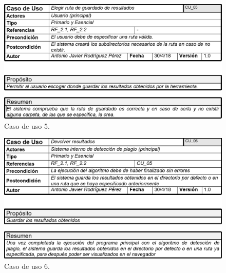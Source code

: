 \begin{figure}[H] %
\centering
\includegraphics[scale=0.5]{imagenes/CU_05.png}  %
\caption{Caso de uso 5.} \label{fig:CU5}
\end{figure}

\begin{figure}[H] %
\centering
\includegraphics[scale=0.5]{imagenes/CU_06.png}  %
\caption{Caso de uso 6.} \label{fig:CU6}
\end{figure}

